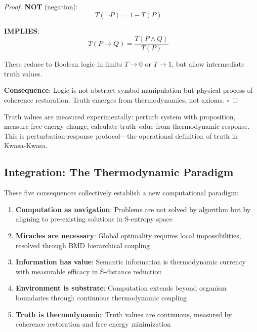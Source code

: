\begin{proof}
\textbf{NOT} (negation):
\begin{equation}
T(\neg P) = 1 - T(P)
\end{equation}

\textbf{IMPLIES}:
\begin{equation}
T(P \to Q) = \frac{T(P \wedge Q)}{T(P)}
\end{equation}

These reduce to Boolean logic in limits $T \to 0$ or $T \to 1$, but allow intermediate truth values.

\textbf{Consequence}: Logic is not abstract symbol manipulation but physical process of coherence restoration. Truth emerges from thermodynamics, not axioms. $\square$
\end{proof}

\begin{corollary}
Truth values are measured experimentally: perturb system with proposition, measure free energy change, calculate truth value from thermodynamic response. This is perturbation-response protocol—the operational definition of truth in Kwasa-Kwasa.
\end{corollary}

\subsection{Integration: The Thermodynamic Paradigm}

These five consequences collectively establish a new computational paradigm:

\begin{enumerate}
\item \textbf{Computation as navigation}: Problems are not solved by algorithm but by aligning to pre-existing solutions in S-entropy space
\item \textbf{Miracles are necessary}: Global optimality requires local impossibilities, resolved through BMD hierarchical coupling
\item \textbf{Information has value}: Semantic information is thermodynamic currency with measurable efficacy in S-distance reduction
\item \textbf{Environment is substrate}: Computation extends beyond organism boundaries through continuous thermodynamic coupling
\item \textbf{Truth is thermodynamic}: Truth values are continuous, measured by coherence restoration and free energy minimization
\end{enumerate}

